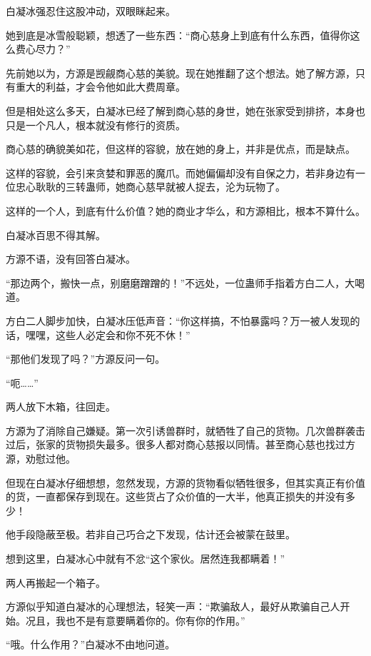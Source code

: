 
\begin{this_body}



白凝冰强忍住这股冲动，双眼眯起来。

她到底是冰雪般聪颖，想透了一些东西：“商心慈身上到底有什么东西，值得你这么费心尽力？”

先前她以为，方源是觊觎商心慈的美貌。现在她推翻了这个想法。她了解方源，只有重大的利益，才会令他如此大费周章。

但是相处这么多天，白凝冰已经了解到商心慈的身世，她在张家受到排挤，本身也只是一个凡人，根本就没有修行的资质。

商心慈的确貌美如花，但这样的容貌，放在她的身上，并非是优点，而是缺点。

这样的容貌，会引来贪婪和罪恶的魔爪。而她偏偏却没有自保之力，若非身边有一位忠心耿耿的三转蛊师，她商心慈早就被人捉去，沦为玩物了。

这样的一个人，到底有什么价值？她的商业才华么，和方源相比，根本不算什么。

白凝冰百思不得其解。

方源不语，没有回答白凝冰。

“那边两个，搬快一点，别磨磨蹭蹭的！”不远处，一位蛊师手指着方白二人，大喝道。

方白二人脚步加快，白凝冰压低声音：“你这样搞，不怕暴露吗？万一被人发现的话，嘿嘿，这些人必定会和你不死不休！”

“那他们发现了吗？”方源反问一句。

“呃……”

两人放下木箱，往回走。

方源为了消除自己嫌疑。第一次引诱兽群时，就牺牲了自己的货物。几次兽群袭击过后，张家的货物损失最多。很多人都对商心慈报以同情。甚至商心慈也找过方源，劝慰过他。

但现在白凝冰仔细想想，忽然发现，方源的货物看似牺牲很多，但其实真正有价值的货，一直都保存到现在。这些货占了众价值的一大半，他真正损失的并没有多少！

他手段隐蔽至极。若非自己巧合之下发现，估计还会被蒙在鼓里。

想到这里，白凝冰心中就有不忿“这个家伙。居然连我都瞒着！”

两人再搬起一个箱子。

方源似乎知道白凝冰的心理想法，轻笑一声：“欺骗敌人，最好从欺骗自己人开始。况且，我也不是有意要瞒着你的。你有你的作用。”

“哦。什么作用？”白凝冰不由地问道。


\end{this_body}
